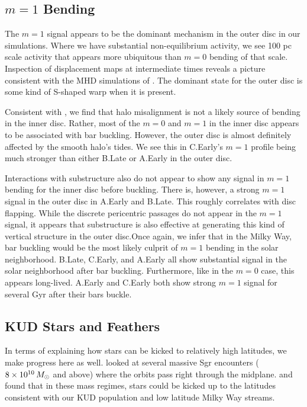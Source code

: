 \subsection{$m=1$ Bending}



The $m=1$ signal appears to be the dominant mechanism in the outer disc in our simulations. Where we have substantial non-equilibrium activity, we see 100 pc scale activity that appears more ubiquitous than $m=0$ bending of that scale. Inspection of displacement maps at intermediate times reveals a picture consistent with the MHD simulations of \citet{gomez_2017}. The dominant state for the outer disc is some kind of S-shaped warp when it is present. 

Consistent with \citet{gomez_2017}, we find that halo misalignment is not a likely source of bending in the inner disc. Rather, most of the $m=0$ and $m=1$ in the inner disc appears to be associated with bar buckling. However, the outer disc is almost definitely affected by the smooth halo's tides. We see this in C.Early's $m=1$ profile being much stronger than either B.Late or A.Early in the outer disc.


Interactions with substructure also do not appear to show any signal in $m=1$ bending for the inner disc before buckling. There is, however, a strong $m=1$ signal in the outer disc in A.Early and B.Late. This roughly correlates with disc flapping. While the discrete pericentric passages do not appear in the $m=1$ signal, it appears that substructure is also effective at generating this kind of vertical structure in the outer disc.Once again, we infer that in the Milky Way, bar buckling would be the most likely culprit of $m=1$ bending in the solar neighborhood. B.Late, C.Early, and A.Early all show substantial signal in the solar neighborhood after bar buckling. Furthermore, like in the $m=0$ case, this appears long-lived. A.Early and C.Early both show strong $m=1$ signal for several Gyr after their bars buckle.


\subsection{KUD Stars and Feathers}

In terms of explaining how stars can be kicked to relatively high latitudes, we make progress here as well. \citet{laporte_2018_b} looked at several massive Sgr encounters ($8 \times 10^{10} \, M_\odot$ and above) where the orbits pass right through the midplane. \citet{laporte_2018_b} and \citet{laporte_2019_feathers} found that in these mass regimes, stars could be kicked up to the latitudes consistent with our KUD population and low latitude Milky Way streams. 


